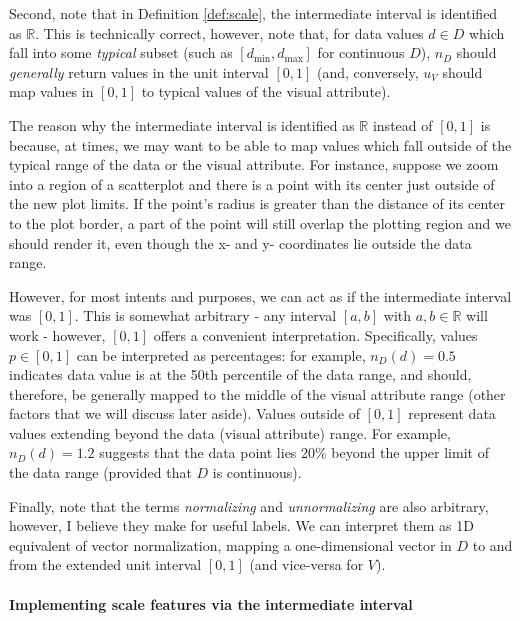\documentclass[
]{book}
\theoremstyle{definition}
\theoremstyle{definition}
\theoremstyle{definition}
\theoremstyle{definition}
\theoremstyle{remark}
\begin{document}
Second, note that in Definition \ref{def:scale}, the intermediate interval is identified as \(\mathbb{R}\). This is technically correct, however, note that, for data values \(d \in D\) which fall into some \emph{typical} subset (such as \([d_{\min}, d_{\max}]\) for continuous \(D\)), \(n_D\) should \emph{generally} return values in the unit interval \([0, 1]\) (and, conversely, \(u_V\) should map values in \([0, 1]\) to typical values of the visual attribute).

The reason why the intermediate interval is identified as \(\mathbb{R}\) instead of \([0, 1]\) is because, at times, we may want to be able to map values which fall outside of the typical range of the data or the visual attribute. For instance, suppose we zoom into a region of a scatterplot and there is a point with its center just outside of the new plot limits. If the point's radius is greater than the distance of its center to the plot border, a part of the point will still overlap the plotting region and we should render it, even though the x- and y- coordinates lie outside the data range.

However, for most intents and purposes, we can act as if the intermediate interval was \([0, 1]\). This is somewhat arbitrary - any interval \([a, b]\) with \(a, b \in \mathbb{R}\) will work - however, \([0, 1]\) offers a convenient interpretation. Specifically, values \(p \in [0, 1]\) can be interpreted as percentages: for example, \(n_D(d) = 0.5\) indicates data value is at the 50th percentile of the data range, and should, therefore, be generally mapped to the middle of the visual attribute range (other factors that we will discuss later aside). Values outside of \([0, 1]\) represent data values extending beyond the data (visual attribute) range. For example, \(n_D(d) = 1.2\) suggests that the data point lies 20\% beyond the upper limit of the data range (provided that \(D\) is continuous).

Finally, note that the terms \emph{normalizing} and \emph{unnormalizing} are also arbitrary, however, I believe they make for useful labels. We can interpret them as 1D equivalent of vector normalization, mapping a one-dimensional vector in \(D\) to and from the extended unit interval \([0, 1]\) (and vice-versa for \(V\)).

\paragraph{Implementing scale features via the intermediate interval}\label{implementing-scale-features-via-the-intermediate-interval}
\end{document}
